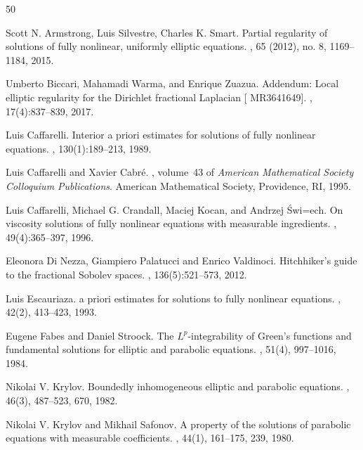 \documentclass[10pt]{article} %
\def\polhk#1{\setbox0=\hbox{#1}{\ooalign{\hidewidth\lower1.5ex\hbox{`}\hidewidth\crcr\unhbox0}}}
\begin{document}
\begin{thebibliography}{50}

Scott N. Armstrong, Luis Silvestre, Charles K. Smart.
\newblock Partial regularity of solutions of fully nonlinear, uniformly elliptic equations.
, 65 (2012), no. 8, 1169--1184,
  2015.

Umberto Biccari, Mahamadi Warma, and Enrique Zuazua.
\newblock Addendum: {L}ocal elliptic regularity for the {D}irichlet fractional
  {L}aplacian [ {MR}3641649].
, 17(4):837--839, 2017.

Luis Caffarelli.
\newblock Interior a priori estimates for solutions of fully nonlinear
  equations.
, 130(1):189--213, 1989.

Luis Caffarelli and Xavier Cabr\'e.
, volume~43 of {\em American
  Mathematical Society Colloquium Publications}.
\newblock American Mathematical Society, Providence, RI, 1995.

Luis Caffarelli, Michael G. Crandall, Maciej Kocan, and Andrzej \'Swi\polhk{e}ch.
\newblock On viscosity solutions of fully nonlinear equations with measurable
  ingredients.
, 49(4):365--397, 1996.

Eleonora Di Nezza, Giampiero Palatucci and Enrico Valdinoci.
\newblock Hitchhiker's guide to the fractional {S}obolev spaces.
, 136(5):521--573, 2012.

Luis Escauriaza.
 a priori estimates for solutions to fully nonlinear
  equations.
, 42(2), 413--423, 1993.

Eugene Fabes and Daniel Stroock.
\newblock The {$L^p$}-integrability of {G}reen's functions and fundamental
  solutions for elliptic and parabolic equations.
, 51(4), 997--1016, 1984.

Nikolai V. Krylov.
\newblock Boundedly inhomogeneous elliptic and parabolic equations.
, 46(3), 487--523, 670, 1982.

Nikolai V. Krylov and Mikhail Safonov.
\newblock A property of the solutions of parabolic equations with measurable
  coefficients.
, 44(1), 161--175, 239, 1980.


\end{thebibliography}
\end{document}
